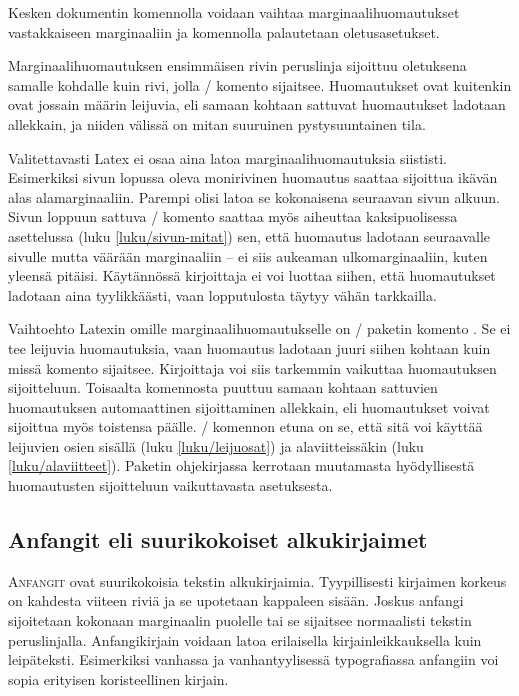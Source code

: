 \noindent
Kesken dokumentin komennolla  voidaan vaihtaa
marginaalihuomautukset vastakkaiseen marginaaliin ja komennolla
 palautetaan oletusasetukset.

Marginaalihuomautuksen ensimmäisen rivin peruslinja sijoittuu oletuksena
samalle kohdalle kuin rivi, jolla \-/ komento
sijaitsee. Huomautukset ovat kuitenkin ovat jossain määrin leijuvia, eli
samaan kohtaan sattuvat huomautukset ladotaan allekkain, ja niiden
välissä on mitan  suuruinen pystysuuntainen tila.

Valitettavasti Latex ei osaa aina latoa marginaalihuomautuksia
siististi. Esimerkiksi sivun lopussa oleva monirivinen huomautus saattaa
sijoittua ikävän alas alamarginaaliin. Parempi olisi latoa se
kokonaisena seuraavan sivun alkuun. Sivun loppuun sattuva
\-/ komento saattaa myös aiheuttaa kaksipuolisessa
asettelussa (luku \ref{luku/sivun-mitat}) sen, että huomautus ladotaan
seuraavalle sivulle mutta väärään marginaaliin -- ei siis aukeaman
ulkomarginaaliin, kuten yleensä pitäisi. Käytännössä kirjoittaja ei voi
luottaa siihen, että huomautukset ladotaan aina tyylikkäästi, vaan
lopputulosta täytyy vähän tarkkailla.

Vaihtoehto Latexin omille marginaalihuomautukselle on
\-/ paketin komento . Se ei
tee leijuvia huomautuksia, vaan huomautus ladotaan juuri siihen kohtaan
kuin missä komento sijaitsee. Kirjoittaja voi siis tarkemmin vaikuttaa
huomautuksen sijoitteluun. Toisaalta komennosta puuttuu samaan kohtaan
sattuvien huomautuksen automaattinen sijoittaminen allekkain, eli
huomautukset voivat sijoittua myös toistensa päälle.
\-/ komennon etuna on se, että sitä voi käyttää
leijuvien osien sisällä (luku \ref{luku/leijuosat}) ja alaviitteissäkin
(luku \ref{luku/alaviitteet}). Paketin ohjekirjassa kerrotaan muutamasta
hyödyllisestä huomautusten sijoitteluun vaikuttavasta asetuksesta.

\subsection{Anfangit eli suurikokoiset alkukirjaimet}

\lettrine[lines=3, loversize=.06, lhang=.02, findent=-5bp, nindent=4bp,
slope=4bp]{A}{nfangit} ovat suurikokoisia tekstin alkukirjaimia.
Tyypillisesti kirjaimen korkeus on kahdesta viiteen riviä ja se
upotetaan kappaleen sisään. Joskus anfangi sijoitetaan kokonaan
marginaalin puolelle tai se sijaitsee normaalisti tekstin peruslinjalla.
Anfangikirjain voidaan latoa erilaisella kirjainleikkauksella kuin
leipäteksti. Esimerkiksi vanhassa ja vanhantyylisessä typografiassa
anfangiin voi sopia erityisen koristeellinen kirjain.

